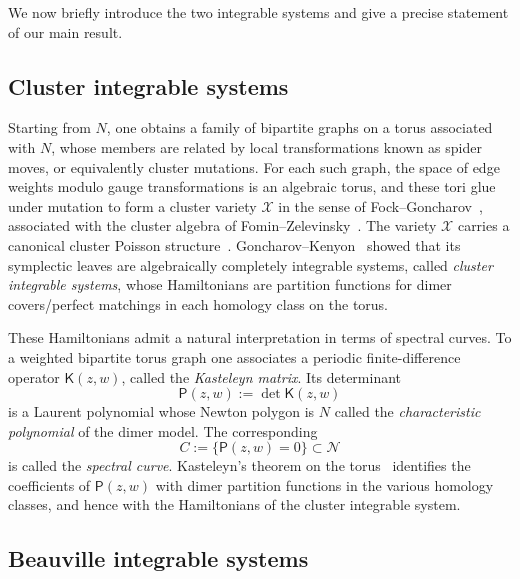 \documentclass[dvipsnames,11pt]{article}
\theoremstyle{definition}
\def\K{\mathsf K}
\begin{document}
We now briefly introduce the two integrable systems and give a precise statement of our main result.

\subsection{Cluster integrable systems}

Starting from $N$, one obtains a family of bipartite graphs on a torus associated with $N$, whose members are related by local transformations known as spider moves, or equivalently cluster mutations. For each such graph, the space of edge weights modulo gauge transformations is an algebraic torus, and these tori glue under mutation to form a cluster variety $\mathcal X$ in the sense of Fock--Goncharov~\cite{FG}, associated with the cluster algebra of Fomin--Zelevinsky~\cite{FZ}. The variety $\mathcal X$ carries a canonical cluster Poisson structure~\cite{GSV}. Goncharov--Kenyon~\cite{GK13} showed that its symplectic leaves are algebraically completely integrable systems, called \emph{cluster integrable systems}, whose Hamiltonians are partition functions for dimer covers/perfect matchings in each homology class on the torus.

These Hamiltonians admit a natural interpretation in terms of spectral curves. To a weighted bipartite torus graph one associates a periodic finite-difference operator $\K(z,w)$, called the \emph{Kasteleyn matrix}. Its determinant
\[
\mathsf P(z,w):=\det \K(z,w)
\]
is a Laurent polynomial whose Newton polygon is $N$ called the \emph{characteristic polynomial} of the dimer model. The corresponding 
\[
C:=\{ \mathsf P(z,w)=0\} \subset \mathcal N
\]
is called the \emph{spectral curve}. Kasteleyn's theorem on the torus~\cite{Kast} identifies the coefficients of $\mathsf P(z,w)$ with dimer partition functions in the various homology classes, and hence with the Hamiltonians of the cluster integrable system.

\subsection{Beauville integrable systems}
\end{document}

